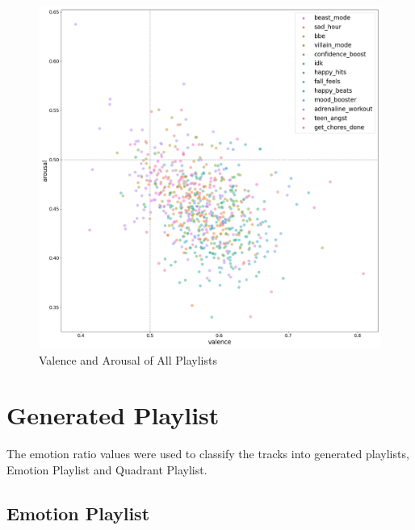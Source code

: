 \documentclass[11pt]{article}
\begin{document}
\begin{figure}[!ht]
  \includegraphics[scale=0.35]{../statics/plots/va_playlist_False.png}
  \centering
  \caption{Valence and Arousal of All Playlists}
  \label{fig:va_pl}
\end{figure}


\section{Generated Playlist}

The emotion ratio values were used to classify the tracks into generated playlists, Emotion Playlist and Quadrant Playlist.

\subsection{Emotion Playlist}
\end{document}
